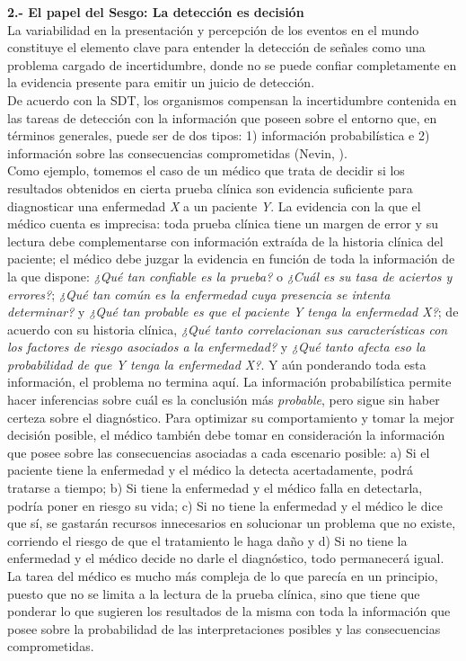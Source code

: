   \textbf{2.- El papel del Sesgo: La detección es decisión}\\

La variabilidad en la presentación y percepción de los eventos en el mundo constituye el elemento clave para entender la detección de señales como una problema cargado de incertidumbre, donde no se puede confiar completamente en la evidencia presente para emitir un juicio de detección.\\

De acuerdo con la SDT, los organismos compensan la incertidumbre contenida en las tareas de detección con la información que poseen sobre el entorno que, en términos generales, puede ser de dos tipos: 1) información probabilística e 2) información sobre las consecuencias comprometidas (Nevin, \citeyear{Nevin1969}).\\

Como ejemplo, tomemos el caso de un médico que trata de decidir si los resultados obtenidos en cierta prueba clínica son evidencia suficiente para diagnosticar una enfermedad \textit{X} a un paciente \textit{Y}. La evidencia con la que el médico cuenta es imprecisa: toda prueba clínica tiene un margen de error y su lectura debe complementarse con información extraída de la historia clínica del paciente; el médico debe juzgar la evidencia en función de toda la información de la que dispone: \textit{¿Qué tan confiable es la prueba?} o \textit{¿Cuál es su tasa de aciertos y errores?}; \textit{¿Qué tan común es la enfermedad cuya presencia se intenta determinar?} y \textit{¿Qué tan probable es que el paciente Y tenga la enfermedad X?}; de acuerdo con su historia clínica, \textit{¿Qué tanto correlacionan sus características con los factores de riesgo asociados a la enfermedad?} y \textit{¿Qué tanto afecta eso la probabilidad de que Y tenga la enfermedad X?}. Y aún ponderando toda esta información, el problema no termina aquí. La información probabilística permite hacer inferencias sobre cuál es la conclusión más \textit{probable}, pero sigue sin haber certeza sobre el diagnóstico. Para optimizar su comportamiento y tomar la mejor decisión posible, el médico también debe tomar en consideración la información que posee sobre las consecuencias asociadas a cada escenario posible: a) Si el paciente tiene la enfermedad y el médico la detecta acertadamente, podrá tratarse a tiempo; b) Si tiene la enfermedad y el médico falla en detectarla, podría poner en riesgo su vida; c) Si no tiene la enfermedad y el médico le dice que sí, se gastarán recursos innecesarios en solucionar un problema que no existe, corriendo el riesgo de que el tratamiento le haga daño y d) Si no tiene la enfermedad y el médico decide no darle el diagnóstico, todo permanecerá igual. La tarea del médico es mucho más compleja de lo que parecía en un principio, puesto que no se limita a la lectura de la prueba clínica, sino que tiene que ponderar lo que sugieren los resultados de la misma con toda la información que posee sobre la probabilidad de las interpretaciones posibles y las consecuencias comprometidas.\\

